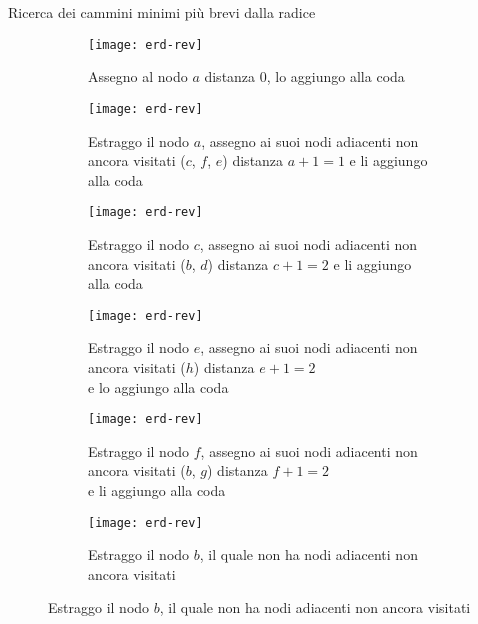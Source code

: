 \begin{algorithm}[H][ht]
	\caption{Ricerca dei cammini minimi più brevi dalla radice}
	
\end{algorithm}

\clearpage
\begin{figure}[H]

	\begin{subfigure}[t]{.48\textwidth}
		\texttt{[image: erd-rev]}
		\caption{Assegno al nodo \(a\) distanza \(0\), lo aggiungo alla coda}
	\end{subfigure}\hfill
	\begin{subfigure}[t]{.48\textwidth}
		\texttt{[image: erd-rev]}
		\caption{Estraggo il nodo \(a\),
			assegno ai suoi nodi adiacenti non ancora visitati (\(c\), \(f\), \(e\)) distanza \(a+1 = 1\)
			e li aggiungo alla coda}
	\end{subfigure}

	\begin{subfigure}[t]{.48\textwidth}
		\texttt{[image: erd-rev]}
		\caption{Estraggo il nodo \(c\),
			assegno ai suoi nodi adiacenti non ancora visitati (\(b\), \(d\)) distanza \(c+1 = 2\)
			e li aggiungo alla coda}
	\end{subfigure}\hfill
	\begin{subfigure}[t]{.48\textwidth}
		\texttt{[image: erd-rev]}
		\caption{Estraggo il nodo \(e\),
			assegno ai suoi nodi adiacenti non ancora visitati (\(h\)) distanza \(e+1 = 2\)\\
			e lo aggiungo alla coda}
	\end{subfigure}

	\begin{subfigure}[t]{.45\textwidth}
		\texttt{[image: erd-rev]}
		\caption{Estraggo il nodo \(f\),
			assegno ai suoi nodi adiacenti non ancora visitati (\(b\), \(g\)) distanza \(f+1 = 2\)\\
			e li aggiungo alla coda}
	\end{subfigure}\hfill
	\begin{subfigure}[t]{.45\textwidth}
		\texttt{[image: erd-rev]}
		\caption{Estraggo il nodo \(b\),
			il quale non ha nodi adiacenti non ancora visitati}
	\end{subfigure}

\end{figure}

